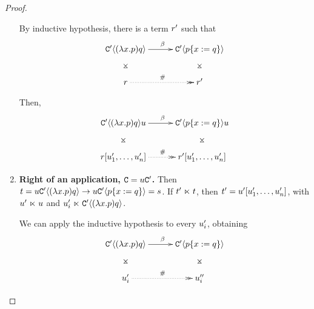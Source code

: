 \begin{proof}
\begin{enumerate}
By inductive hypothesis, there is a term $r'$ such that
\[
\xymatrix@C=1cm{
 \contwoof{(\lam{\var}{\tmfive}) \tmsix} \ar@{}[d]|*=0[@]{\rtimes} \ar[r]^{\beta}
    & \contwoof{\subs{\tmfive}{\var}{\tmsix}} \ar@{}[d]|*=0[@]{\rtimes} \\
 \tmfour \ar@{.>>}[r]^{\dist} & \tmfour' \\
}
\]

Then,
\[
\xymatrix@C=1cm{
 \contwoof{(\lam{\var}{\tmfive}) \tmsix} \tmthree \ar@{}[d]|*=0[@]{\rtimes} \ar[r]^{\beta}
    & \contwoof{\subs{\tmfive}{\var}{\tmsix}} \tmthree \ar@{}[d]|*=0[@]{\rtimes} \\
 \tmfour [\tmthree'_1, \hdots, \tmthree'_n] \ar@{.>>}[r]^{\dist}
    & \tmfour' [\tmthree'_1, \hdots, \tmthree'_n] \\
}
\]
\item {\bf Right of an application, $\mathtt{C} = u \mathtt{C}'$.}
Then $t = u \mathtt{C}'\langle(\lambda x. p) q\rangle
        \to u \mathtt{C}'\langle p\{x := q\}\rangle = s$.
If $t' \mathrel{\ltimes} t$, then $t' = u' [u'_1, \hdots, u'_n]$,
  with $u' \mathrel{\ltimes} u$
  and $u'_i \mathrel{\ltimes} \mathtt{C}'\langle(\lambda x. p) q\rangle$.

We can  apply the inductive hypothesis to every $u'_i$, obtaining
\[
\xymatrix@C=1cm{
 \contwoof{(\lam{\var}{\tmfive}) \tmsix} \ar@{}[d]|*=0[@]{\rtimes} \ar[r]^{\beta}
    & \contwoof{\subs{\tmfive}{\var}{\tmsix}} \ar@{}[d]|*=0[@]{\rtimes} \\
 \tmthree'_i \ar@{.>>}[r]^{\dist} & \tmthree''_i \\
}
\]


\end{enumerate}
\end{proof}
